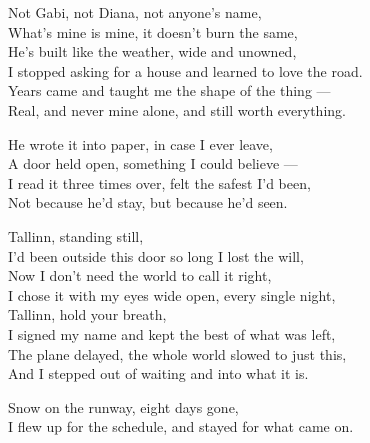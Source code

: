 \begin{lyrics}
Not Gabi, not Diana, not anyone's name,\\
What's mine is mine, it doesn't burn the same,\\
He's built like the weather, wide and unowned,\\
I stopped asking for a house and learned to love the road.\\
Years came and taught me the shape of the thing —\\
Real, and never mine alone, and still worth everything.

He wrote it into paper, in case I ever leave,\\
A door held open, something I could believe —\\
I read it three times over, felt the safest I'd been,\\
Not because he'd stay, but because he'd seen.

Tallinn, standing still,\\
I'd been outside this door so long I lost the will,\\
Now I don't need the world to call it right,\\
I chose it with my eyes wide open, every single night,\\
Tallinn, hold your breath,\\
I signed my name and kept the best of what was left,\\
The plane delayed, the whole world slowed to just this,\\
And I stepped out of waiting and into what it is.

Snow on the runway, eight days gone,\\
I flew up for the schedule, and stayed for what came on.
\end{lyrics}

